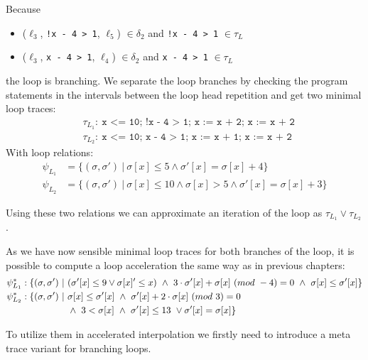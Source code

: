 \documentclass{article}
\begin{document}
Because \begin{itemize}
	\item ($\ell_3$, \texttt{!x - 4 > 1}, $\ell_5$) $\in \delta_2$ and \texttt{!x - 4 > 1} $\in \tau_L$
	\item ($\ell_3$, \texttt{x - 4 > 1}, $\ell_4$) $\in \delta_2$ and \texttt{x - 4 > 1} $\in \tau_L$
\end{itemize}
the loop is branching.
We separate the loop branches by checking the program statements in the intervals between the loop head repetition and get two minimal loop traces:
\begin{align*}
	&\tau_{L_1}:\ \texttt{x <= 10; !x - 4 > 1; x := x + 2;\ x := x + 2} \\
	&\tau_{L_2}:\ \texttt{x <= 10; x - 4 > 1; x := x + 1; x := x + 2}
\end{align*}
With loop relations:
\begin{align*}
	\psi_{L_{1}} &= \{(\sigma, \sigma')\ |\ \sigma[x] \leq 5 \land  \sigma'[x] = \sigma[x] + 4 \} \\
	\psi_{L_{2}}&= \{(\sigma, \sigma')\ |\ \sigma[x] \leq 10 \land \sigma[x] > 5 \land  \sigma'[x] = \sigma[x] + 3 \}
\end{align*}

Using these two relations we can approximate an iteration of the loop as $\tau_{L_1} \lor \tau_{L_2}$. \\ \par
As we have now sensible minimal loop traces for both branches of the loop, it is possible to compute a loop acceleration the same way as in previous chapters:
\begin{align*}
	\psi_{L_{1}}^* &: \{(\sigma, \sigma')\ |\ (\sigma'[x] \leq 9 \lor \sigma[x]' \leq x)\ \land\ 3\cdot \sigma'[x] + \sigma[x]\ (mod\ -4) = 0\ \land\ \sigma[x] \leq \sigma'[x] \} \\
	\psi_{L_{2}}^* &: \{ (\sigma, \sigma')\ | \ \sigma[x] \leq \sigma'[x]\ \land\ \sigma'[x] + 2 \cdot \sigma[x]\ (mod\ 3) = 0 \\
	&\hspace*{1.75cm} \land\ 3 < \sigma[x]\ \land\ \sigma'[x] \leq 13 \ \lor \sigma'[x] = \sigma[x]\}
\end{align*}

To utilize them in accelerated interpolation we firstly need to introduce a meta trace variant for branching loops.
\end{document}
